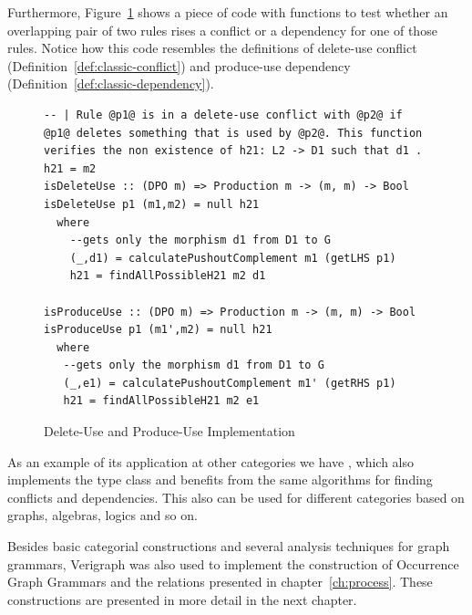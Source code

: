 Furthermore, Figure~\ref{fig:verigraph:delete-use-produce-use} shows a piece of code with functions to test whether an overlapping pair of two rules rises a conflict or a dependency for one of those rules. Notice how this code resembles the definitions of delete-use conflict (Definition~\ref{def:classic-conflict}) and produce-use dependency (Definition~\ref{def:classic-dependency}).


\begin{figure}[!ht]
\caption{Delete-Use and Produce-Use Implementation}
\begin{verbatim}
-- | Rule @p1@ is in a delete-use conflict with @p2@ if @p1@ deletes something that is used by @p2@. This function verifies the non existence of h21: L2 -> D1 such that d1 . h21 = m2
isDeleteUse :: (DPO m) => Production m -> (m, m) -> Bool
isDeleteUse p1 (m1,m2) = null h21
  where
    --gets only the morphism d1 from D1 to G
    (_,d1) = calculatePushoutComplement m1 (getLHS p1) 
    h21 = findAllPossibleH21 m2 d1

isProduceUse :: (DPO m) => Production m -> (m, m) -> Bool
isProduceUse p1 (m1',m2) = null h21
  where
   --gets only the morphism d1 from D1 to G
   (_,e1) = calculatePushoutComplement m1' (getRHS p1)
   h21 = findAllPossibleH21 m2 e1
\end{verbatim}
\label{fig:verigraph:delete-use-produce-use}
\end{figure}

As an example of its application at other categories we have , which also implements the  type class and benefits from the same algorithms for finding conflicts and dependencies. This also can be used for different categories based on graphs, algebras, logics and so on.

Besides basic categorial constructions and several analysis techniques for graph grammars, Verigraph was also used to implement the construction of Occurrence Graph Grammars and the relations presented in chapter~\ref{ch:process}. These constructions are presented in more detail in the next chapter.


